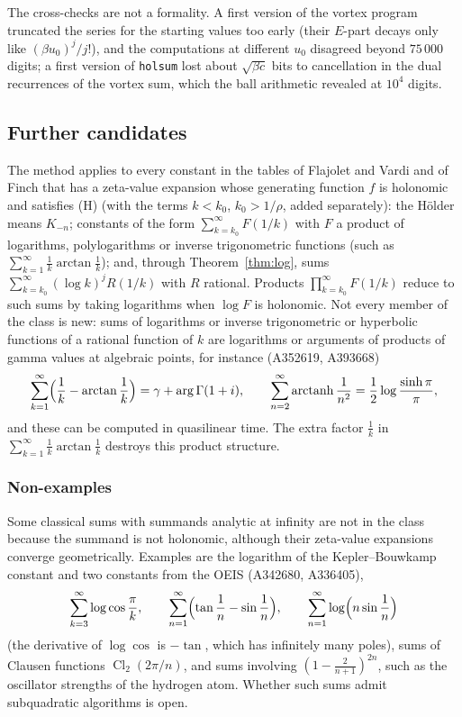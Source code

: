 \documentclass[11pt]{amsart}
\theoremstyle{definition}
\theoremstyle{remark}
\newcommand{\arctanh}{\operatorname{arctanh}}
\begin{document}
The cross-checks are not a formality. A first version of the vortex program truncated the series for the starting
values too early (their $E$-part decays only like $(\beta u_0)^j/j!$), and the computations at different $u_0$ disagreed
beyond $75\,000$ digits; a first version of \texttt{holsum} lost about $\sqrt{\beta c}$ bits to cancellation in the
dual recurrences of the vortex sum, which the ball arithmetic revealed at $10^4$ digits.

\subsection{Further candidates}
The method applies to every constant in the tables of Flajolet and Vardi \cite{FV96} and of Finch \cite{Fin03}
that has a zeta-value expansion whose generating function $f$ is holonomic and satisfies (H) (with the terms $k < k_0$, $k_0 > 1/\rho$,
added separately): the H\"older means $K_{-n}$; constants of the form
$\sum_{k=k_0}^{\infty} F(1/k)$ with $F$ a product of logarithms, polylogarithms or inverse trigonometric functions (such as
$\sum_{k=1}^{\infty} \frac1k\arctan\frac1k$); and, through Theorem~\ref{thm:log}, sums $\sum_{k=k_0}^{\infty} (\log k)^j R(1/k)$ with $R$ rational.
Products $\prod_{k=k_0}^{\infty} F(1/k)$ reduce to such sums by taking logarithms when $\log F$ is holonomic.
Not every member of the class is new: sums of logarithms or inverse trigonometric or hyperbolic functions of a
rational function of $k$ are logarithms or arguments of products of gamma values at algebraic points, for instance
(A352619, A393668)
\[
  \sum_{k=1}^{\infty}\Bigl(\frac1k - \arctan\frac1k\Bigr) = \gamma + \arg\Gamma(1+i), \qquad
  \sum_{n=2}^{\infty}\arctanh\frac1{n^2} = \frac12\log\frac{\sinh\pi}{\pi},
\]
and these can be computed in quasilinear time.
The extra factor $\frac1k$ in $\sum_{k=1}^{\infty}\frac1k\arctan\frac1k$ destroys this product structure.

\subsubsection{Non-examples} Some classical sums with summands analytic at infinity are not in the class because the summand
is not holonomic, although their zeta-value expansions converge geometrically. Examples are the logarithm of the
Kepler--Bouwkamp constant and two constants from the OEIS (A342680, A336405),
\[
  \sum_{k=3}^{\infty}\log\cos\frac\pi k, \qquad \sum_{n=1}^{\infty}\Bigl(\tan\frac1n - \sin\frac1n\Bigr), \qquad
  \sum_{n=1}^{\infty}\log\Bigl(n\sin\frac1n\Bigr)
\]
(the derivative of $\log\cos$ is $-\tan$, which has infinitely many poles), sums of Clausen
functions $\operatorname{Cl}_2(2\pi/n)$, and sums involving $(1 - \frac2{n+1})^{2n}$, such as the oscillator strengths of the
hydrogen atom. Whether such sums admit subquadratic algorithms is open.
\end{document}
